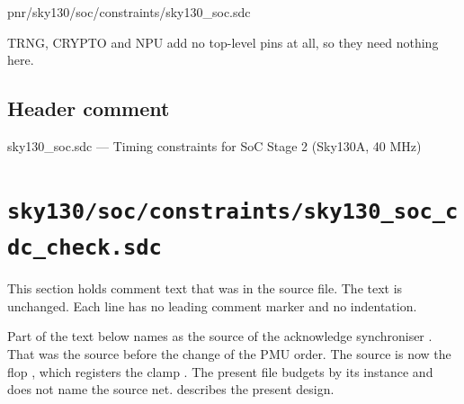\begin{relocated}{pnr/sky130/soc/constraints/sky130_soc.sdc}
\begin{textblock}
TRNG, CRYPTO and NPU add no top-level pins at all, so they need nothing here.
\end{textblock}

\subsection*{Header comment}

\begin{textblock}
sky130_soc.sdc — Timing constraints for SoC Stage 2 (Sky130A, 40 MHz)
\end{textblock}

\end{relocated}

\section{\texttt{sky130/soc/constraints/sky130\_soc\_cdc\_check.sdc}}\label{tm:pd:sky130-soc-cdc-check-sdc}

This section holds comment text that was in the source file. The text is unchanged. Each line has no leading comment marker and no indentation.

\begin{information}
Part of the text below names  as the source of the acknowledge synchroniser . That was the source before the change of the PMU order. The source is now the flop , which registers the clamp . The present file budgets  by its instance and does not name the source net.  describes the present design.
\end{information}

